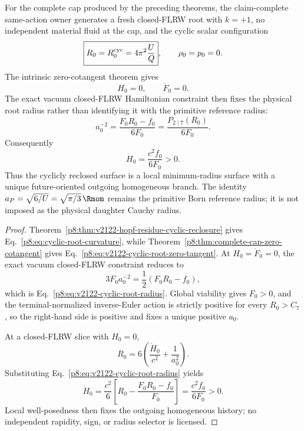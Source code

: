 \documentclass[12pt,a4paper]{article}
\begin{document}
\begin{theorem}
\label{p8:cor:born-contact-cap-renewal}
\label{p8:thm:complete-cap-root-cauchy-reclosure}
For the complete cap produced by the preceding theorems, the claim-complete
same-action owner generates a fresh closed-FLRW root with \(k=+1\), no
independent material fluid at the cap, and the cyclic scalar configuration
\begin{equation}
\label{p8:eq:cyclic-root-curvature}
 \boxed{R_0=R_0^{\rm cyc}=4\pi^2\frac{U}{Q}},
 \qquad \rho_0=p_0=0.
\end{equation}
The intrinsic zero-cotangent theorem gives
\begin{equation}
\label{p8:eq:v2122-cyclic-root-zero-tangent}
 \boxed{H_0=0,\qquad \dot F_0=0.}
\end{equation}
The exact vacuum closed-FLRW Hamiltonian constraint then fixes the physical
root radius rather than identifying it with the primitive reference radius:
\begin{equation}
\label{p8:eq:v2122-cyclic-root-radius}
 \boxed{
 a_0^{-2}
 =\frac{F_0R_0-f_0}{6F_0}
 =\frac{P_{2\mid7}(R_0)}{6F_0}.}
\end{equation}
Consequently
\begin{equation}
\label{p8:eq:cyclic-root-bounce-sign}
 \boxed{
 \dot H_0
 =\frac{c^2f_0}{6F_0}>0.}
\end{equation}
Thus the cyclicly reclosed surface is a local minimum-radius surface with a
unique future-oriented outgoing homogeneous branch.  The identity
\(a_P=\sqrt{6/U}=\sqrt{\pi/3}\,\Rmom\) remains the primitive Born reference radius; it is
not imposed as the physical daughter Cauchy radius.
\end{theorem}

\begin{proof}
Theorem~\ref{p8:thm:v2122-hopf-residue-cyclic-reclosure} gives
Eq.~\eqref{p8:eq:cyclic-root-curvature}, while
Theorem~\ref{p8:thm:complete-cap-zero-cotangent} gives
Eq.~\eqref{p8:eq:v2122-cyclic-root-zero-tangent}.  At \(H_0=\dot F_0=0\), the
exact vacuum closed-FLRW constraint reduces to
\[
 3F_0a_0^{-2}=\frac12(F_0R_0-f_0),
\]
which is Eq.~\eqref{p8:eq:v2122-cyclic-root-radius}.  Global viability gives
\(F_0>0\), and the terminal-normalized inverse-Euler action is strictly
positive for every \(R_0>C_7\), so the right-hand side is positive and fixes a
unique positive \(a_0\).

At a closed-FLRW slice with \(H_0=0\),
\[
 R_0=6\left(\frac{\dot H_0}{c^2}+\frac1{a_0^2}\right).
\]
Substituting Eq.~\eqref{p8:eq:v2122-cyclic-root-radius} yields
\[
 \dot H_0
 =\frac{c^2}{6}\left[R_0-
 \frac{F_0R_0-f_0}{F_0}\right]
 =\frac{c^2f_0}{6F_0}>0.
\]
Local well-posedness then fixes the outgoing homogeneous history; no
independent rapidity, sign, or radius selector is licensed.
\end{proof}
\end{document}
